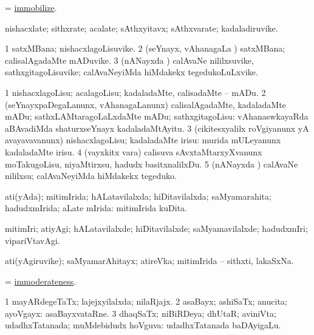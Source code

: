 \bentry
{}
\gl{\sakirx}
\bmng
 = \hyperlink{immobilize}{immobilize}. 
\emng
\eentry

\bentry
{}
\gl{\nA}
\bmng
nishacxlate; sithxrate; acalate; sAthxyitavx; sAthxvarate; kadaladiruvike. 
\emng
\eentry

\bentry
{}
\gl{\nA}
\bmng
\bnum
\num{1} satxMBana; nishacxlagoLisuvike. 
\num{2} (seYnayx, vAhanagaLa \vi) satxMBana; calisalAgadaMte mADuvike. 
\num{3} (nANayxda \vi) calAvaNe nililxsuvike, sathxgitagoLisuvike; calAvaNeyiMda hiMdakekx tegedukoLuLxvike. 
\enum
\emng
\eentry

\bentry
{}
\gl{\sakirx}
\bmng
\bnum
\num{1} nishacxlagoLisu; acalagoLisu; kadaladaMte, calisadaMte -- mADu. 
\num{2} (seYnayxpaDegaLanunx, vAhanagaLanunx) calisalAgadaMte, kadaladaMte mADu; sathxLAMtaragoLaLxdaMte mADu; sathxgitagoLisu:  vAhanaswkayaRda aBAvadiMda shaturxseYnayx kadaladaMtAyitu. 
\num{3} (cikitesxyalilx roVgiyanunx yA avayavavanunx) nishacxlagoLisu; kadaladaMte irisu:  murida mULeyanunx kadaladaMte irisu. 
\num{4} (vayxkitx \mo vara) calisuva sAvxtaMtarxyXvanunx moTakugoLisu, niyaMtirxsu, hadudx basitxnalilxDu. 
\num{5} (nANayxda \vi) calAvaNe nililxsu; calAvaNeyiMda hiMdakekx tegeduko. 
\enum
\emng
\eentry

\bentry
{}
\gl{\gu}
\bmng
ati(yAda); mitimIrida; hALatavilalxda; hiDitavilalxda; saMyamarahita; hadudxmIrida; aLate mIrida:  mitimIrida kuDita. 
\emng
\eentry

\bentry
{}
\gl{\kirxvi}
\bmng
mitimIri; atiyAgi; hALatavilalxde; hiDitavilalxde; saMyamavilalxde; hadudxmIri; vipariVtavAgi. 
\emng
\eentry

\bentry
{}
\gl{\nA}
\bmng
ati(yAgiruvike); saMyamarAhitayx; atireVka; mitimIrida -- sithxti, lakaSxNa. 
\emng
\eentry

\bentry
{}
\gl{\nA}
\bmng
 = \hyperlink{immoderateness}{immoderateness}. 
\emng
\eentry

\bentry
{}
\gl{\gu}
\bmng
\bnum
\num{1} mayARdegeTaTx; lajejxyilalxda; nilaRjajx. 
\num{2} asaBayx; ashiSaTx; anucita; ayoVgayx:  asaBayxvataRne. 
\num{3} dhaqSaTx; niBiRDeya; dhUtaR; aviniVta; udadhxTatanada; muMdebidudx hoVguva:  udadhxTatanada baDAyigaLu. 
\enum
\emng
\eentry

